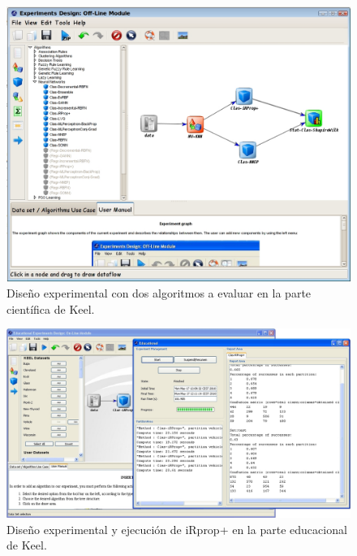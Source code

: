 \begin{figure}[!h]
\centering
\includegraphics[keepaspectratio,width=12.7cm]{figuras/keel1.jpg}
\caption{Diseño experimental con dos algoritmos a evaluar en la parte científica de Keel.}
\label{fig5aplica}
\end{figure}
\paginavaciasincuerpo
\begin{figure}[!h]
\centering
\includegraphics[keepaspectratio,width=12.7cm]{figuras/keel2.jpg}
\caption{Diseño experimental y ejecución de iRprop+ en la parte educacional de Keel.}
\label{fig6aplica}
\end{figure}
\paginavaciacompleta